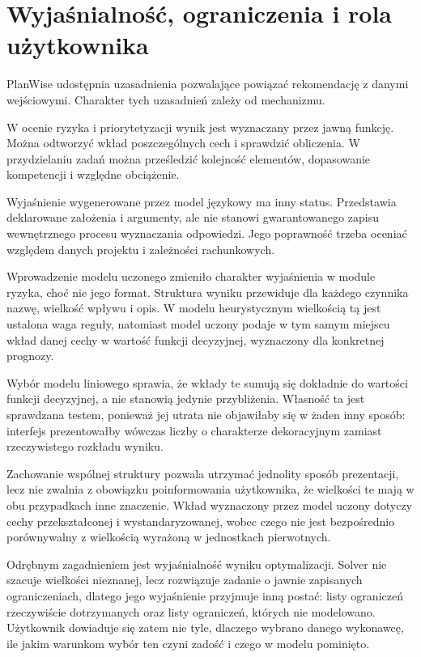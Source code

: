 \section{Wyjaśnialność, ograniczenia i rola użytkownika}

PlanWise udostępnia uzasadnienia pozwalające powiązać rekomendację z danymi wejściowymi. Charakter tych uzasadnień zależy od mechanizmu.

W ocenie ryzyka i priorytetyzacji wynik jest wyznaczany przez jawną funkcję. Można odtworzyć wkład poszczególnych cech i sprawdzić obliczenia. W przydzielaniu zadań można prześledzić kolejność elementów, dopasowanie kompetencji i względne obciążenie.

Wyjaśnienie wygenerowane przez model językowy ma inny status. Przedstawia deklarowane założenia i argumenty, ale nie stanowi gwarantowanego zapisu wewnętrznego procesu wyznaczania odpowiedzi. Jego poprawność trzeba oceniać względem danych projektu i zależności rachunkowych.

Wprowadzenie modelu uczonego zmieniło charakter wyjaśnienia w module ryzyka, choć nie jego format. Struktura wyniku przewiduje dla każdego czynnika nazwę, wielkość wpływu i opis. W modelu heurystycznym wielkością tą jest ustalona waga reguły, natomiast model uczony podaje w tym samym miejscu wkład danej cechy w wartość funkcji decyzyjnej, wyznaczony dla konkretnej prognozy.

Wybór modelu liniowego sprawia, że wkłady te sumują się dokładnie do wartości funkcji decyzyjnej, a nie stanowią jedynie przybliżenia. Własność ta jest sprawdzana testem, ponieważ jej utrata nie objawiłaby się w żaden inny sposób: interfejs prezentowałby wówczas liczby o charakterze dekoracyjnym zamiast rzeczywistego rozkładu wyniku.

Zachowanie wspólnej struktury pozwala utrzymać jednolity sposób prezentacji, lecz nie zwalnia z obowiązku poinformowania użytkownika, że wielkości te mają w obu przypadkach inne znaczenie. Wkład wyznaczony przez model uczony dotyczy cechy przekształconej i wystandaryzowanej, wobec czego nie jest bezpośrednio porównywalny z wielkością wyrażoną w jednostkach pierwotnych.

Odrębnym zagadnieniem jest wyjaśnialność wyniku optymalizacji. Solver nie szacuje wielkości nieznanej, lecz rozwiązuje zadanie o jawnie zapisanych ograniczeniach, dlatego jego wyjaśnienie przyjmuje inną postać: listy ograniczeń rzeczywiście dotrzymanych oraz listy ograniczeń, których nie modelowano. Użytkownik dowiaduje się zatem nie tyle, dlaczego wybrano danego wykonawcę, ile jakim warunkom wybór ten czyni zadość i czego w modelu pominięto.

